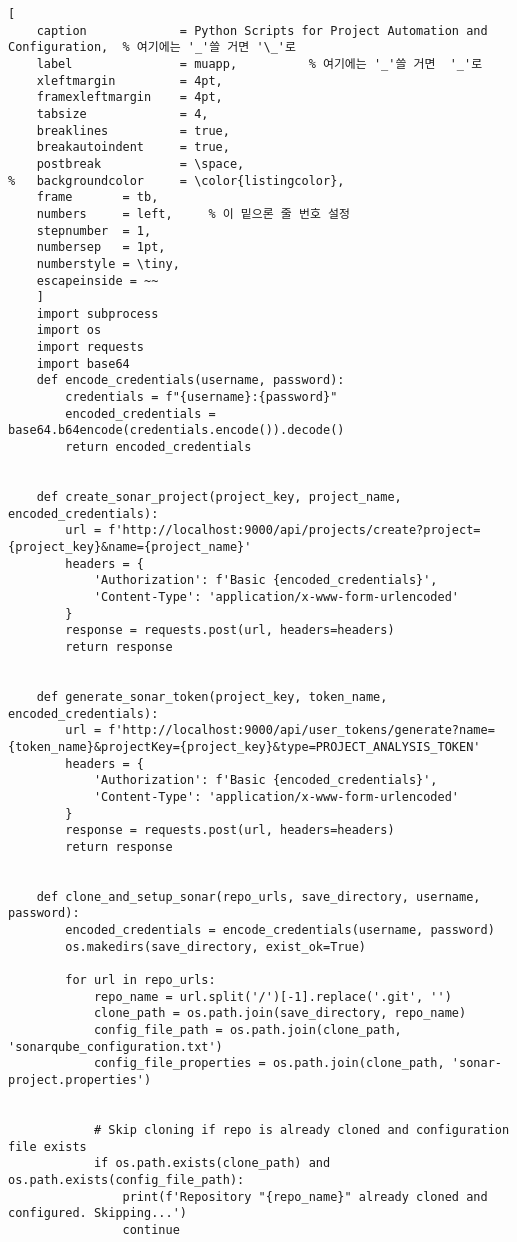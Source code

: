 \begin{lstlisting}[
	caption				= Python Scripts for Project Automation and Configuration,	% 여기에는 '_'쓸 거면 '\_'로
	label				= muapp,          % 여기에는 '_'쓸 거면  '_'로
	xleftmargin			= 4pt,
	framexleftmargin	= 4pt,
	tabsize				= 4,
	breaklines			= true,
	breakautoindent		= true,
	postbreak			= \space,
%	backgroundcolor		= \color{listingcolor}, 
	frame		= tb,
	numbers		= left,		% 이 밑으론 줄 번호 설정
	stepnumber	= 1,
	numbersep	= 1pt,
	numberstyle	= \tiny,
	escapeinside = ~~
	]	
    import subprocess
    import os
    import requests
    import base64
    def encode_credentials(username, password):
        credentials = f"{username}:{password}"
        encoded_credentials = base64.b64encode(credentials.encode()).decode()
        return encoded_credentials
    
    
    def create_sonar_project(project_key, project_name, encoded_credentials):
        url = f'http://localhost:9000/api/projects/create?project={project_key}&name={project_name}'
        headers = {
            'Authorization': f'Basic {encoded_credentials}',
            'Content-Type': 'application/x-www-form-urlencoded'
        }
        response = requests.post(url, headers=headers)
        return response
    
    
    def generate_sonar_token(project_key, token_name, encoded_credentials):
        url = f'http://localhost:9000/api/user_tokens/generate?name={token_name}&projectKey={project_key}&type=PROJECT_ANALYSIS_TOKEN'
        headers = {
            'Authorization': f'Basic {encoded_credentials}',
            'Content-Type': 'application/x-www-form-urlencoded'
        }
        response = requests.post(url, headers=headers)
        return response
    
    
    def clone_and_setup_sonar(repo_urls, save_directory, username, password):
        encoded_credentials = encode_credentials(username, password)
        os.makedirs(save_directory, exist_ok=True)
    
        for url in repo_urls:
            repo_name = url.split('/')[-1].replace('.git', '')
            clone_path = os.path.join(save_directory, repo_name)
            config_file_path = os.path.join(clone_path, 'sonarqube_configuration.txt')
            config_file_properties = os.path.join(clone_path, 'sonar-project.properties')
    
    
            # Skip cloning if repo is already cloned and configuration file exists
            if os.path.exists(clone_path) and os.path.exists(config_file_path):
                print(f'Repository "{repo_name}" already cloned and configured. Skipping...')
                continue
    

\end{lstlisting}
